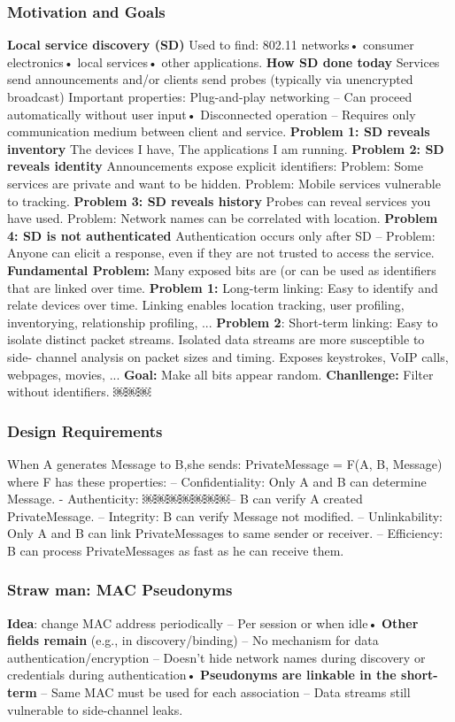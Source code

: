 \documentclass[9pt]{extarticle}
\begin{document}
\begin{multicols}{2}
\subsubsection{Motivation and Goals}
\textbf{Local service discovery (SD)} Used to find: 802.11 networks• consumer electronics• local services• other applications. \textbf{How SD done today} Services send announcements and/or clients send probes (typically via unencrypted broadcast)
Important properties: Plug-and-play networking
– Can proceed automatically without user input• Disconnected operation – Requires only communication medium between client and service. \textbf{Problem 1: SD reveals inventory} The devices I have, The applications I am running. \textbf{Problem 2: SD reveals identity} Announcements expose explicit identifiers: Problem: Some services are private and want to be hidden. Problem: Mobile services vulnerable to tracking. \textbf{Problem 3: SD reveals history} Probes can reveal services you have used. Problem: Network names can be correlated with location. \textbf{Problem 4: SD is not authenticated} Authentication occurs only after SD – Problem: Anyone can elicit a response, even if they are not trusted to access the service. \textbf{Fundamental Problem:} Many exposed bits are (or can be used as identifiers that are linked over time. \textbf{Problem 1:} Long-term linking: Easy to identify and relate devices over time. Linking enables location tracking, user profiling, inventorying, relationship profiling, ... \textbf{Problem 2}: Short-term linking: Easy to isolate distinct packet streams. Isolated data streams are more susceptible to side- channel analysis on packet sizes and timing. Exposes keystrokes, VoIP calls, webpages, movies, ... \textbf{Goal:} Make all bits appear random. \textbf{Chanllenge: } Filter without identifiers.
￼￼￼
\subsubsection{Design Requirements}
When A generates Message to B,she sends: PrivateMessage = F(A, B, Message) where F has these properties: – Confidentiality: Only A and B can determine Message. - Authenticity: ￼￼￼￼￼￼￼– B can verify A created PrivateMessage. – Integrity: B can verify Message not modified. – Unlinkability: Only A and B can link PrivateMessages to same sender or receiver. – Efficiency:
B can process PrivateMessages as fast as he can receive them. 


\subsubsection{Straw man: MAC Pseudonyms}
\textbf{Idea}: change MAC address periodically – Per session or when idle• \textbf{Other fields remain} (e.g., in discovery/binding) – No mechanism for data authentication/encryption – Doesn’t hide network names during discovery or credentials during authentication• \textbf{Pseudonyms are linkable in the short-term} – Same MAC must be used for each association – Data streams still vulnerable to side-channel leaks. 


\end{multicols}
\end{document}
